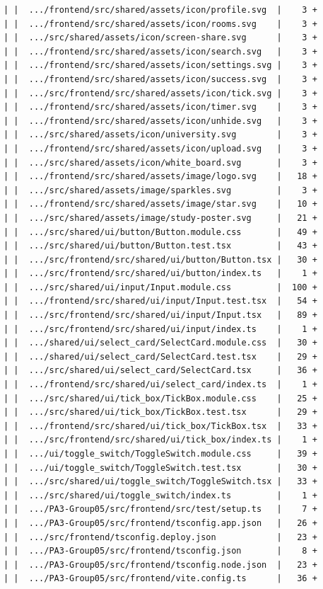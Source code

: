 \documentclass[12pt]{article}
\begin{document}
\begin{lstlisting}[numbers=none,breaklines=true]
| |  .../frontend/src/shared/assets/icon/profile.svg  |    3 +
| |  .../frontend/src/shared/assets/icon/rooms.svg    |    3 +
| |  .../src/shared/assets/icon/screen-share.svg      |    3 +
| |  .../frontend/src/shared/assets/icon/search.svg   |    3 +
| |  .../frontend/src/shared/assets/icon/settings.svg |    3 +
| |  .../frontend/src/shared/assets/icon/success.svg  |    3 +
| |  .../src/frontend/src/shared/assets/icon/tick.svg |    3 +
| |  .../frontend/src/shared/assets/icon/timer.svg    |    3 +
| |  .../frontend/src/shared/assets/icon/unhide.svg   |    3 +
| |  .../src/shared/assets/icon/university.svg        |    3 +
| |  .../frontend/src/shared/assets/icon/upload.svg   |    3 +
| |  .../src/shared/assets/icon/white_board.svg       |    3 +
| |  .../frontend/src/shared/assets/image/logo.svg    |   18 +
| |  .../src/shared/assets/image/sparkles.svg         |    3 +
| |  .../frontend/src/shared/assets/image/star.svg    |   10 +
| |  .../src/shared/assets/image/study-poster.svg     |   21 +
| |  .../src/shared/ui/button/Button.module.css       |   49 +
| |  .../src/shared/ui/button/Button.test.tsx         |   43 +
| |  .../src/frontend/src/shared/ui/button/Button.tsx |   30 +
| |  .../src/frontend/src/shared/ui/button/index.ts   |    1 +
| |  .../src/shared/ui/input/Input.module.css         |  100 +
| |  .../frontend/src/shared/ui/input/Input.test.tsx  |   54 +
| |  .../src/frontend/src/shared/ui/input/Input.tsx   |   89 +
| |  .../src/frontend/src/shared/ui/input/index.ts    |    1 +
| |  .../shared/ui/select_card/SelectCard.module.css  |   30 +
| |  .../shared/ui/select_card/SelectCard.test.tsx    |   29 +
| |  .../src/shared/ui/select_card/SelectCard.tsx     |   36 +
| |  .../frontend/src/shared/ui/select_card/index.ts  |    1 +
| |  .../src/shared/ui/tick_box/TickBox.module.css    |   25 +
| |  .../src/shared/ui/tick_box/TickBox.test.tsx      |   29 +
| |  .../frontend/src/shared/ui/tick_box/TickBox.tsx  |   33 +
| |  .../src/frontend/src/shared/ui/tick_box/index.ts |    1 +
| |  .../ui/toggle_switch/ToggleSwitch.module.css     |   39 +
| |  .../ui/toggle_switch/ToggleSwitch.test.tsx       |   30 +
| |  .../src/shared/ui/toggle_switch/ToggleSwitch.tsx |   33 +
| |  .../src/shared/ui/toggle_switch/index.ts         |    1 +
| |  .../PA3-Group05/src/frontend/src/test/setup.ts   |    7 +
| |  .../PA3-Group05/src/frontend/tsconfig.app.json   |   26 +
| |  .../src/frontend/tsconfig.deploy.json            |   23 +
| |  .../PA3-Group05/src/frontend/tsconfig.json       |    8 +
| |  .../PA3-Group05/src/frontend/tsconfig.node.json  |   23 +
| |  .../PA3-Group05/src/frontend/vite.config.ts      |   36 +

\end{lstlisting}
\end{document}
